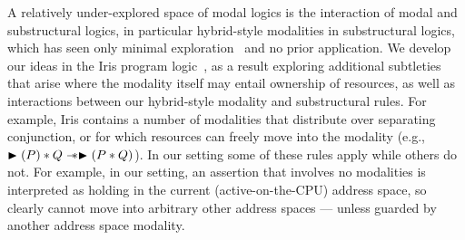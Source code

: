 A relatively under-explored space of modal logics is the interaction of modal and substructural logics, 
in particular hybrid-style modalities in substructural logics, which has seen only minimal exploration~\cite{dovsen1992modal,restall1993modalities,d1997grafting,kamide2002kripke,licata2017fibrational} and no prior 
application. We develop our ideas in the Iris program logic~\cite{jung2018iris}, as a result exploring additional subtleties 
that arise where the modality itself may entail ownership of resources, as well as interactions between our hybrid-style 
modality and substructural rules.  For example, Iris contains a number of modalities that distribute over separating 
conjunction, or for which resources can freely move into the modality 
(e.g., $\blacktriangleright(P)\ast Q \mathrel{-\!\!\ast} \blacktriangleright(P\ast Q)$). In our setting some of these rules 
apply while others do not. For example, in our setting, an assertion that involves no modalities is interpreted as 
holding in the current (active-on-the-CPU) address space, so clearly cannot move into arbitrary other address spaces 
--- unless guarded by another address space modality.
%
%
